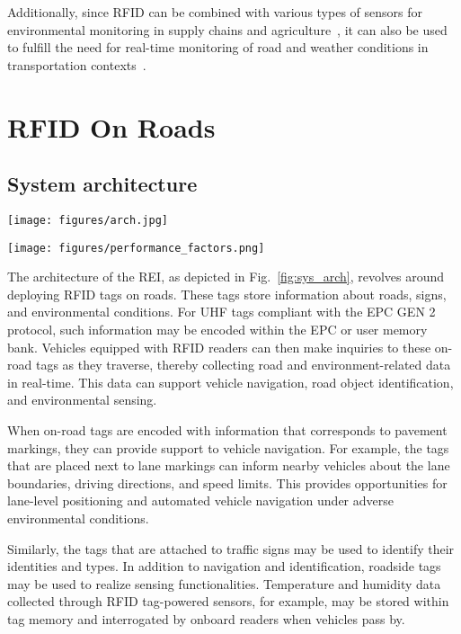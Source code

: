 \documentclass[lettersize,journal]{IEEEtran}
\begin{document}
Additionally, since RFID can be combined with various types of sensors for environmental monitoring in supply chains and agriculture~\cite{mezzanotte2021innovative,palazzi2019feeding}, it can also be used to fulfill the need for real-time monitoring of road and weather conditions in transportation contexts~\cite{costa2021review}.
 
\section{RFID On Roads}
\subsection{System architecture}

\begin{figure*}[tb!]
\centering
\texttt{[image: figures/arch.jpg]}
\caption{The architecture of RFID on Roads System}
\label{fig:sys_arch}
\end{figure*}

\begin{figure*}[tb!]
\centering
\texttt{[image: figures/performance\_factors.png]}
\caption{The influencing factors for the performance of RF-enhanced road infrastructure.}
\label{fig:performance_fact}
\end{figure*}


The architecture of the REI, as depicted in Fig.~\ref{fig:sys_arch}, revolves around deploying RFID tags on roads. These tags store information about roads, signs, and environmental conditions. For UHF tags compliant with the EPC GEN 2 protocol, such information may be encoded within the EPC or user memory bank. Vehicles equipped with RFID readers can then make inquiries to these on-road tags as they traverse, thereby collecting road and environment-related data in real-time. This data can support vehicle navigation, road object identification, and environmental sensing.

When on-road tags are encoded with information that corresponds to pavement markings, they can provide support to vehicle navigation. For example, the tags that are placed next to lane markings can inform nearby vehicles about the lane boundaries, driving directions, and speed limits. This provides opportunities for lane-level positioning and automated vehicle navigation under adverse environmental conditions.

Similarly, the tags that are attached to traffic signs may be used to identify their identities and types. In addition to navigation and identification, roadside tags may be used to realize sensing functionalities. Temperature and humidity data collected through RFID tag-powered sensors, for example, may be stored within tag memory and interrogated by onboard readers when vehicles pass by.
\end{document}
